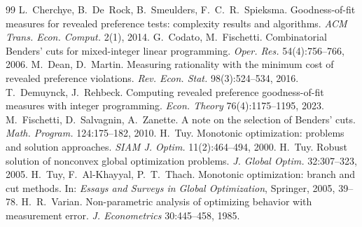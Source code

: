 \documentclass[a4paper,11pt]{article}
\theoremstyle{plain}
\theoremstyle{definition}
\theoremstyle{remark}
\begin{document}
\begin{thebibliography}{99}
 L.~Cherchye, B.~De~Rock, B.~Smeulders, F.~C.~R.~Spieksma. Goodness-of-fit measures for revealed preference tests: complexity results and algorithms. \textit{ACM Trans. Econ. Comput.} 2(1), 2014.
 G.~Codato, M.~Fischetti. Combinatorial Benders' cuts for mixed-integer linear programming. \textit{Oper. Res.} 54(4):756--766, 2006.
 M.~Dean, D.~Martin. Measuring rationality with the minimum cost of revealed preference violations. \textit{Rev. Econ. Stat.} 98(3):524--534, 2016.
 T.~Demuynck, J.~Rehbeck. Computing revealed preference goodness-of-fit measures with integer programming. \textit{Econ. Theory} 76(4):1175--1195, 2023.
 M.~Fischetti, D.~Salvagnin, A.~Zanette. A note on the selection of Benders' cuts. \textit{Math. Program.} 124:175--182, 2010.
 H.~Tuy. Monotonic optimization: problems and solution approaches. \textit{SIAM J. Optim.} 11(2):464--494, 2000.
 H.~Tuy. Robust solution of nonconvex global optimization problems. \textit{J. Global Optim.} 32:307--323, 2005.
 H.~Tuy, F.~Al-Khayyal, P.~T.~Thach. Monotonic optimization: branch and cut methods. In: \textit{Essays and Surveys in Global Optimization}, Springer, 2005, 39--78.
 H.~R.~Varian. Non-parametric analysis of optimizing behavior with measurement error. \textit{J. Econometrics} 30:445--458, 1985.
\end{thebibliography}
\end{document}

